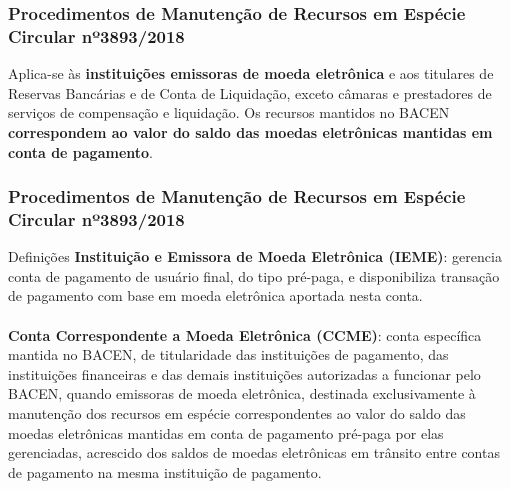 \documentclass[10pt]{beamer}
\begin{document}
\begin{frame} 
\frametitle{Procedimentos de Manutenção de Recursos em Espécie\\Circular nº3893/2018}

Aplica-se às \textbf{instituições emissoras de moeda eletrônica} e aos titulares de Reservas Bancárias e de Conta de Liquidação, exceto câmaras e prestadores de serviços de compensação e liquidação. Os recursos mantidos no BACEN \textbf{correspondem ao valor do saldo das moedas eletrônicas mantidas em conta de pagamento}.

\end{frame}

\begin{frame} 
\frametitle{Procedimentos de Manutenção de Recursos em Espécie\\Circular nº3893/2018}

\begin{block}{Definições}
	\textbf{Instituição e Emissora de Moeda Eletrônica (IEME)}: gerencia conta de pagamento de usuário final, do tipo pré-paga, e disponibiliza transação de pagamento com base em moeda eletrônica aportada nesta conta.
	\\~\\
	\textbf{Conta Correspondente a Moeda Eletrônica (CCME)}: conta específica mantida no BACEN, de titularidade das instituições de pagamento, das instituições financeiras e das demais instituições autorizadas a funcionar pelo BACEN, quando emissoras de moeda eletrônica, destinada exclusivamente à manutenção dos recursos em espécie correspondentes ao valor do saldo das moedas eletrônicas mantidas em conta de pagamento pré-paga por elas gerenciadas, acrescido dos saldos de moedas eletrônicas em trânsito entre contas de pagamento na mesma instituição de pagamento.
\end{block}

\end{frame}
\end{document}
